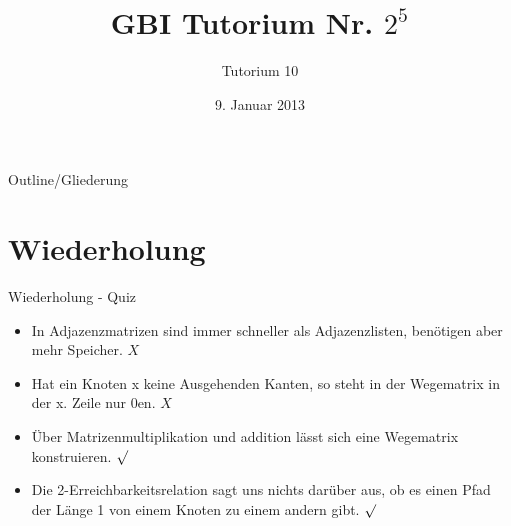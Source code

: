 

\title[Tutorium 10]{GBI Tutorium Nr. $2^5$}
\subtitle{Tutorium 10}
\date{9. Januar 2013}






	\begin{frame}
		\titlepage
	\end{frame}

	\begin{frame}{Outline/Gliederung}
		\tableofcontents
	\end{frame}	
		
	
	
	\section{Wiederholung} 
	\begin{frame} {Wiederholung - Quiz}
		\begin{itemize}
			\item In Adjazenzmatrizen sind immer schneller als Adjazenzlisten, benötigen aber mehr Speicher.
			\only<2-> {\color{red}$X$}\\
			\color{black}
					
			\item Hat ein Knoten x keine Ausgehenden Kanten, so steht in der Wegematrix in der x. Zeile nur 0en.
			\only<3-> {\color{red}$X$}\\
			\color{black}
	
			\item Über Matrizenmultiplikation und addition lässt sich eine Wegematrix konstruieren.
			\only<4-> {\color{darkgreen}$\surd$}\\
			\color{black}
			
			\item Die 2-Erreichbarkeitsrelation sagt uns nichts darüber aus, ob es einen Pfad der Länge 1 von einem Knoten zu einem andern gibt.
			\only<4-> {\color{darkgreen}$\surd$}\\
			\color{black}
		\end{itemize}
	\end{frame}
	
	
	
